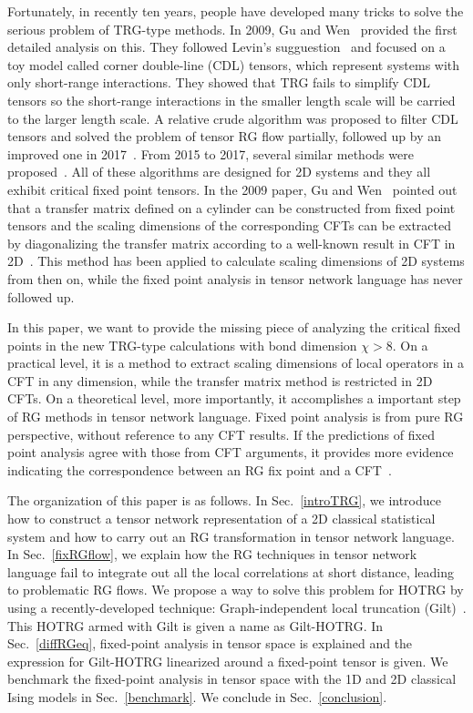 \documentclass[aps,prb,reprint,superscriptaddress]{revtex4-2}
\begin{document}
Fortunately, in recently ten years, people have developed many tricks to
solve the serious problem of TRG-type methods. In 2009, Gu and
Wen~\cite{GuWen2009} provided the first detailed analysis on this. They
followed Levin's sugguestion~\cite{trg,LevinTalk} and focused on a toy
model called corner double-line (CDL) tensors, which represent systems
with only short-range interactions. They showed that TRG fails to
simplify CDL tensors so the short-range interactions in the smaller
length scale will be carried to the larger length scale. A relative
crude algorithm was proposed to filter CDL tensors and solved the
problem of tensor RG flow partially, followed up by an improved one in
2017~\cite{looptnr}. From 2015 to 2017, several similar methods were
proposed~\cite{tnr,tnralgo,tnrplus}. All of these algorithms are
designed for 2D systems and they all exhibit critical fixed point
tensors. In the 2009 paper, Gu and Wen~\cite{GuWen2009} pointed out that
a transfer matrix defined on a cylinder can be constructed from fixed
point tensors and the scaling dimensions of the corresponding CFTs can
be extracted by diagonalizing the transfer matrix according to a
well-known result in CFT in 2D~\cite{cardy1986}.  This method has been
applied to calculate scaling dimensions of 2D systems from then on,
while the fixed point analysis in tensor network language has never
followed up.
%

In this paper, we want to provide the missing piece of analyzing the
critical fixed points in the new TRG-type calculations with bond
dimension $\chi > 8$. On a practical level, it is a method to extract
scaling dimensions of local operators in a CFT in any dimension, while
the transfer matrix method is restricted in 2D CFTs. On a theoretical
level, more importantly, it accomplishes a important step of RG methods
in tensor network language.  Fixed point analysis is from pure RG
perspective, without reference to any CFT results. If the predictions of
fixed point analysis agree with those from CFT arguments, it provides
more evidence indicating the correspondence between an RG fix point and
a CFT~\cite{poland2019}.
%

The organization of this paper is as follows. In Sec.~\ref{introTRG}, we
introduce how to construct a tensor network representation of a 2D
classical statistical system and how to carry out an RG transformation
in tensor network language. In Sec.~\ref{fixRGflow}, we explain how the
RG techniques in tensor network language fail to integrate out all the
local correlations at short distance, leading to problematic RG flows.
We propose a way to solve this problem for HOTRG by using a
recently-developed technique: Graph-independent local truncation
(Gilt)~\cite{gilts}. This HOTRG armed with Gilt is given a name as
Gilt-HOTRG.  In Sec.~\ref{diffRGeq}, fixed-point analysis in tensor
space is explained and the expression for Gilt-HOTRG linearized around a
fixed-point tensor is given. We benchmark the fixed-point analysis in
tensor space with the 1D and 2D classical Ising models in
Sec.~\ref{benchmark}. We conclude in Sec.~\ref{conclusion}.
\end{document}
